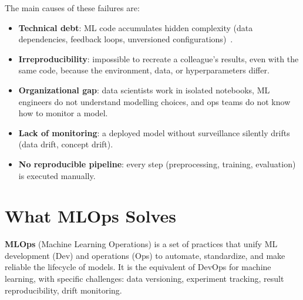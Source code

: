 The main causes of these failures are:
\begin{itemize}
  \item \textbf{Technical debt}: ML code accumulates
    hidden complexity (data dependencies, feedback loops, unversioned
    configurations)~\cite{sculley2015}.
  \item \textbf{Irreproducibility}: impossible to recreate a colleague's
    results, even with the same code, because the environment, data, or
    hyperparameters differ.
  \item \textbf{Organizational gap}: data scientists work in isolated
    notebooks, ML engineers do not understand modelling choices, and ops
    teams do not know how to monitor a model.
  \item \textbf{Lack of monitoring}: a deployed model without surveillance
    silently drifts (data drift, concept drift).
  \item \textbf{No reproducible pipeline}: every step (preprocessing,
    training, evaluation) is executed manually.
\end{itemize}

\section*{What MLOps Solves}

\textbf{MLOps} (Machine Learning Operations) is a set of
practices that unify ML development (Dev) and operations (Ops) to automate,
standardize, and make reliable the lifecycle of models. It is the equivalent
of DevOps for machine learning, with specific challenges: data versioning,
experiment tracking, result reproducibility, drift monitoring.

\begin{center}
\end{center}

